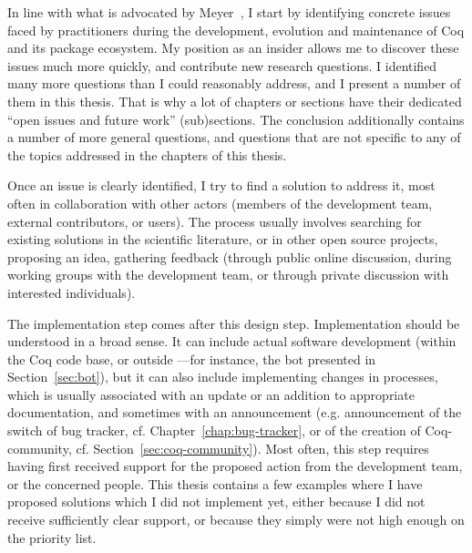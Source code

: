 In line with what is advocated by Meyer~\cite{meyer2018empirical}, I start by identifying concrete issues faced by practitioners during the development, evolution and maintenance of Coq and its package ecosystem.
My position as an insider allows me to discover these issues much more quickly, and contribute new research questions.
I identified many more questions than I could reasonably address, and I present a number of them in this thesis.
That is why a lot of chapters or sections have their dedicated ``open issues and future work'' (sub)sections.
The conclusion additionally contains a number of more general questions, and questions that are not specific to any of the topics addressed in the chapters of this thesis.

Once an issue is clearly identified, I try to find a solution to address it, most often in collaboration with other actors (members of the development team, external contributors, or users).
The process usually involves searching for existing solutions in the scientific literature, or in other open source projects, proposing an idea, gathering feedback (through public online discussion, during working groups with the development team, or through private discussion with interested individuals).

The implementation step comes after this design step.
Implementation should be understood in a broad sense.
It can include actual software development (within the Coq code base, or outside ---for instance, the bot presented in Section~\ref{sec:bot}), but it can also include implementing changes in processes, which is usually associated with an update or an addition to appropriate documentation, and sometimes with an announcement (e.g. announcement of the switch of bug tracker, cf. Chapter~\ref{chap:bug-tracker}, or of the creation of Coq-community, cf. Section~\ref{sec:coq-community}).
Most often, this step requires having first received support for the proposed action from the development team, or the concerned people.
This thesis contains a few examples where I have proposed solutions which I did not implement yet, either because I did not receive sufficiently clear support, or because they simply were not high enough on the priority list.


